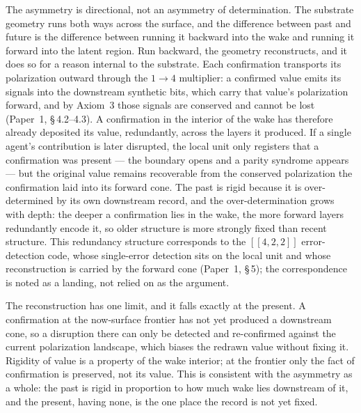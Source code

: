 \documentclass[11pt,oneside]{report}
\theoremstyle{definition}
\theoremstyle{remark}
\begin{document}
The asymmetry is directional, not an asymmetry of determination. The
substrate geometry runs both ways across the surface, and the difference
between past and future is the difference between running it backward into
the wake and running it forward into the latent region. Run backward, the
geometry reconstructs, and it does so for a reason internal to the
substrate. Each confirmation transports its polarization outward through
the \ensuremath{1\to 4} multiplier: a confirmed value emits its signals
into the downstream synthetic bits, which carry that value's polarization
forward, and by Axiom~3 those signals are conserved and cannot be lost
(Paper~1, \S\,4.2--4.3). A confirmation in the interior of the wake has
therefore already deposited its value, redundantly, across the layers it
produced. If a single agent's contribution is later disrupted, the local
unit only registers that a confirmation was present --- the boundary opens
and a parity syndrome appears --- but the original value remains
recoverable from the conserved polarization the confirmation laid into its
forward cone. The past is rigid because it is over-determined by its own
downstream record, and the over-determination grows with depth: the deeper
a confirmation lies in the wake, the more forward layers redundantly
encode it, so older structure is more strongly fixed than recent
structure. This redundancy structure corresponds to the \ensuremath{[[4,2,2]]}
error-detection code, whose single-error detection sits on the local unit
and whose reconstruction is carried by the forward cone (Paper~1, \S\,5);
the correspondence is noted as a landing, not relied on as the argument.

The reconstruction has one limit, and it falls exactly at the present. A
confirmation at the now-surface frontier has not yet produced a downstream
cone, so a disruption there can only be detected and re-confirmed against
the current polarization landscape, which biases the redrawn value without
fixing it. Rigidity of value is a property of the wake interior; at the
frontier only the fact of confirmation is preserved, not its value. This
is consistent with the asymmetry as a whole: the past is rigid in
proportion to how much wake lies downstream of it, and the present, having
none, is the one place the record is not yet fixed.
\end{document}
